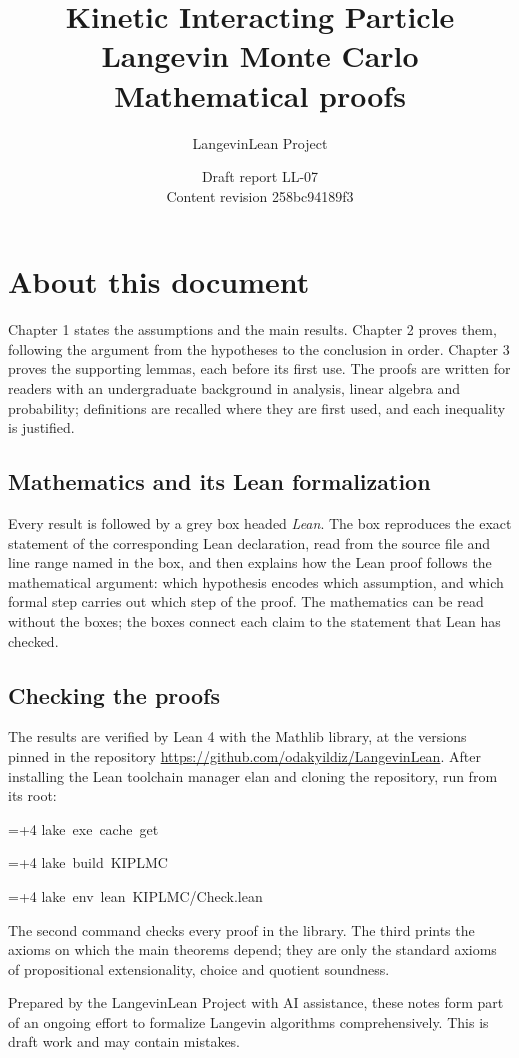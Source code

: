 \documentclass[11pt,a4paper]{report}
\title{\texorpdfstring{Kinetic Interacting Particle Langevin Monte Carlo}{Kinetic Interacting Particle Langevin Monte Carlo}\\[0.6em]\large Mathematical proofs}
\author{LangevinLean Project}
\date{Draft report LL-07\\[0.4em]\small Content revision 258bc94189f3}
\newlength{\leancharwidth}
\newenvironment{leancode}{\par\smallskip\begingroup\ttfamily\footnotesize\raggedright
  \settowidth{\leancharwidth}{M}\setlength{\parskip}{0pt}\setlength{\parindent}{0pt}
  \frenchspacing}{\par\endgroup\smallskip}
\newcommand{\leanline}[2]{\hangindent=\dimexpr#1\leancharwidth+4\leancharwidth\relax
  \hangafter=1\noindent\hspace*{#1\leancharwidth}#2\par}
\begin{document}
\maketitle
\chapter*{About this document}
Chapter 1 states the assumptions and the main results. Chapter 2 proves them, following the argument from the hypotheses to the conclusion in order. Chapter 3 proves the supporting lemmas, each before its first use. The proofs are written for readers with an undergraduate background in analysis, linear algebra and probability; definitions are recalled where they are first used, and each inequality is justified.

\section*{Mathematics and its Lean formalization}
Every result is followed by a grey box headed \emph{Lean}. The box reproduces the exact statement of the corresponding Lean declaration, read from the source file and line range named in the box, and then explains how the Lean proof follows the mathematical argument: which hypothesis encodes which assumption, and which formal step carries out which step of the proof. The mathematics can be read without the boxes; the boxes connect each claim to the statement that Lean has checked.

\section*{Checking the proofs}
The results are verified by Lean 4 with the Mathlib library, at the versions pinned in the repository \url{https://github.com/odakyildiz/LangevinLean}. After installing the Lean toolchain manager elan and cloning the repository, run from its root:
\begin{leancode}
\leanline{0}{lake\ exe\ cache\ get}
\leanline{0}{lake\ build\ KIPLMC}
\leanline{0}{lake\ env\ lean\ KIPLMC/Check.lean}
\end{leancode}
The second command checks every proof in the library. The third prints the axioms on which the main theorems depend; they are only the standard axioms of propositional extensionality, choice and quotient soundness.

Prepared by the LangevinLean Project with AI assistance, these notes form part of an ongoing effort to formalize Langevin algorithms comprehensively. This is draft work and may contain mistakes.
\end{document}
